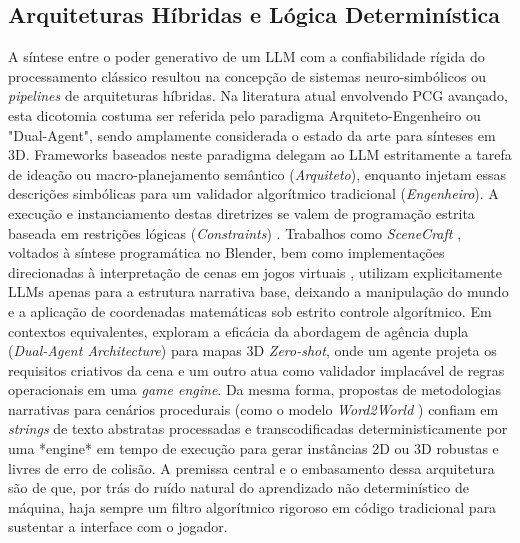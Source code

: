 \subsection{Arquiteturas Híbridas e Lógica Determinística}
A síntese entre o poder generativo de um LLM com a confiabilidade rígida do processamento clássico resultou na concepção de sistemas neuro-simbólicos ou \textit{pipelines} de arquiteturas híbridas. Na literatura atual envolvendo PCG avançado, esta dicotomia costuma ser referida pelo paradigma Arquiteto-Engenheiro ou "Dual-Agent", sendo amplamente considerada o estado da arte para sínteses em 3D.
Frameworks baseados neste paradigma delegam ao LLM estritamente a tarefa de ideação ou macro-planejamento semântico (\textit{Arquiteto}), enquanto injetam essas descrições simbólicas para um validador algorítmico tradicional (\textit{Engenheiro}). A execução e instanciamento destas diretrizes se valem de programação estrita baseada em restrições lógicas (\textit{Constraints}) \cite{xu2025constraint}. Trabalhos como \textit{SceneCraft} \cite{hu2024scenecraft}, voltados à síntese programática no Blender, bem como implementações direcionadas à interpretação de cenas em jogos virtuais \cite{xu2025databasedrivenframework3dlevel}, utilizam explicitamente LLMs apenas para a estrutura narrativa base, deixando a manipulação do mundo e a aplicação de coordenadas matemáticas sob estrito controle algorítmico.
Em contextos equivalentes, \cite{her2025zeroshot3dmapgeneration} exploram a eficácia da abordagem de agência dupla (\textit{Dual-Agent Architecture}) para mapas 3D \textit{Zero-shot}, onde um agente projeta os requisitos criativos da cena e um outro atua como validador implacável de regras operacionais em uma \textit{game engine}. Da mesma forma, propostas de metodologias narrativas para cenários procedurais (como o modelo \textit{Word2World} \cite{nasir2024word2worldgeneratingstoriesworlds}) confiam em \textit{strings} de texto abstratas processadas e transcodificadas deterministicamente por uma *engine* em tempo de execução para gerar instâncias 2D ou 3D robustas e livres de erro de colisão. A premissa central e o embasamento dessa arquitetura são de que, por trás do ruído natural do aprendizado não determinístico de máquina, haja sempre um filtro algorítmico rigoroso em código tradicional para sustentar a interface com o jogador.

